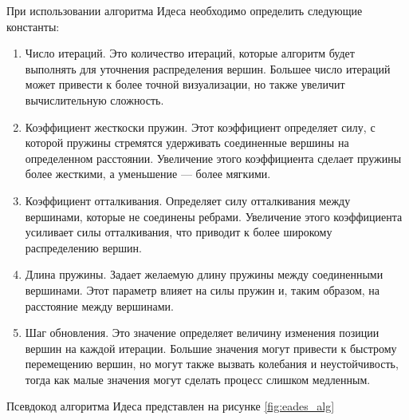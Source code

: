 \documentclass[14pt, russian]{scrartcl}
\begin{document}
При использовании алгоритма Идеса необходимо определить следующие константы:

\begin{enumerate}
	\item{Число итераций. Это количество итераций, которые алгоритм будет выполнять для уточнения распределения вершин. Большее число итераций может привести к более точной визуализации, но также увеличит вычислительную сложность.}
	\item{Коэффициент жесткоски пружин. Этот коэффициент определяет силу, с которой пружины стремятся удерживать соединенные вершины на определенном расстоянии. Увеличение этого коэффициента сделает пружины более жесткими, а уменьшение — более мягкими.}
	\item{Коэффициент отталкивания. Определяет силу отталкивания между вершинами, которые не соединены ребрами. Увеличение этого коэффициента усиливает силы отталкивания, что приводит к более широкому распределению вершин.}
	\item{Длина пружины. Задает желаемую длину пружины между соединенными вершинами. Этот параметр влияет на силы пружин и, таким образом, на расстояние между вершинами. }
	\item{Шаг обновления. Это значение определяет величину изменения позиции вершин на каждой итерации. Большие значения могут привести к быстрому перемещению вершин, но могут также вызвать колебания и неустойчивость, тогда как малые значения могут сделать процесс слишком медленным.}
\end{enumerate}

Псевдокод алгоритма Идеса представлен на рисунке \ref{fig:eades_alg}
\end{document}

